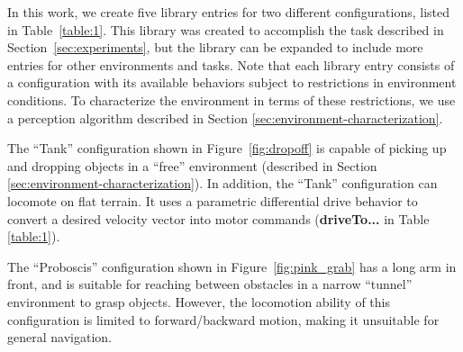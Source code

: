\documentclass[conference]{IEEEtran}
\begin{document}
In this work, we create five library entries for two different configurations,
listed in Table~\ref{table:1}. This library was created to accomplish the task described in Section~\ref{sec:experiments}, but the library can be expanded to include more entries for other environments and tasks. Note that each library entry consists of a configuration with its available behaviors subject to restrictions in environment conditions. To characterize the environment in terms of these restrictions, we use a perception algorithm described in Section \ref{sec:environment-characterization}.

The ``Tank'' configuration shown in Figure~\ref{fig:dropoff} is capable of picking
up and dropping objects in a ``free'' environment (described in Section \ref{sec:environment-characterization}). In addition, the ``Tank'' configuration can locomote on flat terrain. It uses a parametric differential drive behavior to convert a desired velocity vector into motor commands (\textbf{driveTo...} in Table \ref{table:1}).

The ``Proboscis'' configuration shown in Figure~\ref{fig:pink_grab} has
a long arm in front, and is suitable for reaching between obstacles in a narrow ``tunnel'' environment to grasp objects.
However, the locomotion ability of this configuration is limited to forward/backward
motion, making it unsuitable for general navigation.
\end{document}
